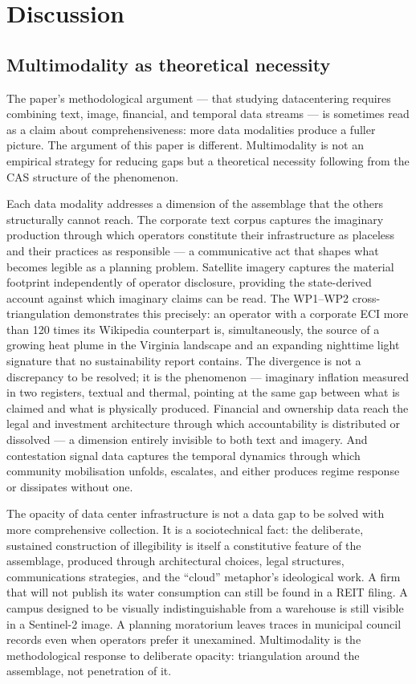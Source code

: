 \section{Discussion}
\label{sec:discussion}

\subsection{Multimodality as theoretical necessity}

The paper's methodological argument — that studying datacentering requires combining text, image, financial, and temporal data streams — is sometimes read as a claim about comprehensiveness: more data modalities produce a fuller picture. The argument of this paper is different. Multimodality is not an empirical strategy for reducing gaps but a theoretical necessity following from the CAS structure of the phenomenon.

Each data modality addresses a dimension of the assemblage that the others structurally cannot reach. The corporate text corpus captures the imaginary production through which operators constitute their infrastructure as placeless and their practices as responsible — a communicative act that shapes what becomes legible as a planning problem. Satellite imagery captures the material footprint independently of operator disclosure, providing the state-derived account against which imaginary claims can be read. The WP1--WP2 cross-triangulation demonstrates this precisely: an operator with a corporate ECI more than 120 times its Wikipedia counterpart is, simultaneously, the source of a growing heat plume in the Virginia landscape and an expanding nighttime light signature that no sustainability report contains. The divergence is not a discrepancy to be resolved; it is the phenomenon — imaginary inflation measured in two registers, textual and thermal, pointing at the same gap between what is claimed and what is physically produced. Financial and ownership data reach the legal and investment architecture through which accountability is distributed or dissolved — a dimension entirely invisible to both text and imagery. And contestation signal data captures the temporal dynamics through which community mobilisation unfolds, escalates, and either produces regime response or dissipates without one.

The opacity of data center infrastructure is not a data gap to be solved with more comprehensive collection. It is a sociotechnical fact: the deliberate, sustained construction of illegibility is itself a constitutive feature of the assemblage, produced through architectural choices, legal structures, communications strategies, and the ``cloud'' metaphor's ideological work. A firm that will not publish its water consumption can still be found in a REIT filing. A campus designed to be visually indistinguishable from a warehouse is still visible in a Sentinel-2 image. A planning moratorium leaves traces in municipal council records even when operators prefer it unexamined. Multimodality is the methodological response to deliberate opacity: triangulation around the assemblage, not penetration of it.

